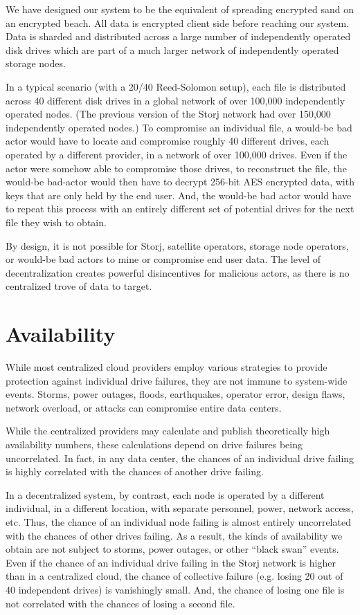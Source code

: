 \documentclass[8pt,fleqn,openany]{book}
\begin{document}
We have designed our system to be the equivalent of spreading encrypted sand
on an encrypted beach. All data is encrypted client side before reaching our
system. Data is sharded and distributed across a large number of independently
operated disk drives which are part of a much larger network of independently
operated storage nodes.

In a typical scenario (with a 20/40 Reed-Solomon
setup), each file is distributed across 40 different disk drives in a global
network of over 100,000 independently operated nodes. (The previous version of
the Storj network had over 150,000 independently operated nodes.) To compromise
an individual file, a would-be bad actor would have to locate and compromise
roughly 40 different drives, each operated by a different provider, in a
network of over 100,000 drives. Even if the actor were somehow able to
compromise those drives, to reconstruct the file, the would-be bad-actor would
then have to decrypt 256-bit AES encrypted data, with keys that are only held
by the end user. And, the would-be bad actor would have to repeat this process
with an entirely different set of potential drives for the next file they wish
to obtain.

By design, it is not possible for Storj, satellite operators,
storage node operators, or would-be bad actors to mine or compromise end user
data. The level of decentralization creates powerful disincentives for
malicious actors, as there is no centralized trove of data to target.

\section{Availability}

While most centralized cloud providers employ various strategies to provide
protection against individual drive failures, they are not immune to
system-wide events. Storms, power outages, floods, earthquakes, operator error,
design flaws, network overload, or attacks can compromise entire data centers.

While the centralized providers may calculate and publish theoretically high
availability numbers, these calculations depend on drive failures being
uncorrelated. In fact, in any data center, the chances of an individual drive
failing is highly correlated with the chances of another drive failing.

In a decentralized system, by contrast, each node is operated by a different
individual, in a different location, with separate personnel, power, network
access, etc. Thus, the chance of an individual node failing is almost entirely
uncorrelated with the chances of other drives failing. As a result, the kinds
of availability we obtain are not subject to storms, power outages, or other
``black swan'' events. Even if the chance of an individual drive failing in the
Storj network is higher than in a centralized cloud, the chance of collective
failure (e.g. losing 20 out of 40 independent drives) is vanishingly small.
And, the chance of losing one file is not correlated with the chances of
losing a second file.
\end{document}
